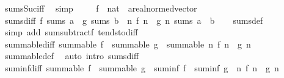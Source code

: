 \begin{isabellebody}
\endisadelimproof
%
\isatagproof
{}\isamarkupfalse%
\ sums{\isacharunderscore}{\kern0pt}Suc{\isacharunderscore}{\kern0pt}iff\ \isamarkupfalse%
\ simp%
\endisatagproof
{\isafoldproof}%
%
\isadelimproof
\isanewline
%
\endisadelimproof
\isanewline
{}\isamarkupfalse%
\isanewline
\isanewline
{}\isamarkupfalse%
\ \isanewline
\ \ \ f\ {\isacharcolon}{\kern0pt}{\isacharcolon}{\kern0pt}\ {\isachardoublequoteopen}nat\ {\isasymRightarrow}\ {\isacharprime}{\kern0pt}a{\isacharcolon}{\kern0pt}{\isacharcolon}{\kern0pt}real{\isacharunderscore}{\kern0pt}normed{\isacharunderscore}{\kern0pt}vector{\isachardoublequoteclose}\isanewline
{}\isanewline
\isanewline
{}\isamarkupfalse%
\ sums{\isacharunderscore}{\kern0pt}diff{\isacharcolon}{\kern0pt}\ {\isachardoublequoteopen}f\ sums\ a\ {\isasymLongrightarrow}\ g\ sums\ b\ {\isasymLongrightarrow}\ {\isacharparenleft}{\kern0pt}{\isasymlambda}n{\isachardot}{\kern0pt}\ f\ n\ {\isacharminus}{\kern0pt}\ g\ n{\isacharparenright}{\kern0pt}\ sums\ {\isacharparenleft}{\kern0pt}a\ {\isacharminus}{\kern0pt}\ b{\isacharparenright}{\kern0pt}{\isachardoublequoteclose}\isanewline
%
\isadelimproof
\ \ %
\endisadelimproof
%
\isatagproof
{}\isamarkupfalse%
\ sums{\isacharunderscore}{\kern0pt}def\ \isamarkupfalse%
\ {\isacharparenleft}{\kern0pt}simp\ add{\isacharcolon}{\kern0pt}\ sum{\isacharunderscore}{\kern0pt}subtractf\ tendsto{\isacharunderscore}{\kern0pt}diff{\isacharparenright}{\kern0pt}%
\endisatagproof
{\isafoldproof}%
%
\isadelimproof
\isanewline
%
\endisadelimproof
\isanewline
{}\isamarkupfalse%
\ summable{\isacharunderscore}{\kern0pt}diff{\isacharcolon}{\kern0pt}\ {\isachardoublequoteopen}summable\ f\ {\isasymLongrightarrow}\ summable\ g\ {\isasymLongrightarrow}\ summable\ {\isacharparenleft}{\kern0pt}{\isasymlambda}n{\isachardot}{\kern0pt}\ f\ n\ {\isacharminus}{\kern0pt}\ g\ n{\isacharparenright}{\kern0pt}{\isachardoublequoteclose}\isanewline
%
\isadelimproof
\ \ %
\endisadelimproof
%
\isatagproof
{}\isamarkupfalse%
\ summable{\isacharunderscore}{\kern0pt}def\ \isamarkupfalse%
\ {\isacharparenleft}{\kern0pt}auto\ intro{\isacharcolon}{\kern0pt}\ sums{\isacharunderscore}{\kern0pt}diff{\isacharparenright}{\kern0pt}%
\endisatagproof
{\isafoldproof}%
%
\isadelimproof
\isanewline
%
\endisadelimproof
\isanewline
{}\isamarkupfalse%
\ suminf{\isacharunderscore}{\kern0pt}diff{\isacharcolon}{\kern0pt}\ {\isachardoublequoteopen}summable\ f\ {\isasymLongrightarrow}\ summable\ g\ {\isasymLongrightarrow}\ suminf\ f\ {\isacharminus}{\kern0pt}\ suminf\ g\ {\isacharequal}{\kern0pt}\ {\isacharparenleft}{\kern0pt}{\isasymSum}n{\isachardot}{\kern0pt}\ f\ n\ {\isacharminus}{\kern0pt}\ g\ n{\isacharparenright}{\kern0pt}{\isachardoublequoteclose}\isanewline

\end{isabellebody}
